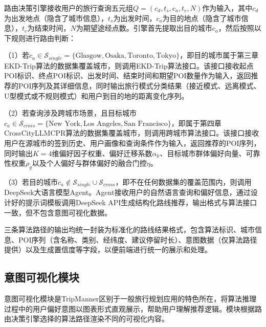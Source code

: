 路由决策引擎接收用户的旅行查询五元组$Q = (c_d, t_s, c_a, t_e, N)$作为输入，其中$c_d$为出发地点（隐含了城市信息），$t_s$为出发时间，$c_a$为目的地点（隐含了城市信息），$t_e$为结束时间，$N$为期望途经点数。引擎首先提取出目的城市$c_a$，然后按照以下规则进行路由判断：

（1）若$c_a \in \mathcal{S}_{single} = \{\text{Glasgow}, \text{Osaka}, \text{Toronto}, \text{Tokyo}\}$，即目的城市属于第三章EKD-Trip算法的数据集覆盖城市，则调用EKD-Trip算法接口。该接口接收起点POI标识、终点POI标识、出发时间、结束时间和期望POI数量作为输入，返回推荐的POI序列及其详细信息，同时输出旅行模式分类结果（接近模式、远离模式、U型模式或不规则模式）和用户到目的地的距离变化序列。

（2）若查询涉及跨城市场景，且目标城市$c_a \in \mathcal{S}_{cross} = \{\text{New York}, \text{Los Angeles}, \text{San Francisco}\}$，即属于第四章CrossCityLLMCPR算法的数据集覆盖城市，则调用跨城市算法接口。该接口接收用户在源城市的签到历史、用户画像和查询条件作为输入，返回推荐的POI序列，同时输出$K=4$维偏好因子权重、偏好迁移系数$\alpha_k$、目标城市群体偏好向量、可靠性权重$\rho_g$以及个人偏好与群体偏好的融合门控$\eta$。

（3）若目的城市$c_a \notin \mathcal{S}_{single} \cup \mathcal{S}_{cross}$，即不在任何数据集的覆盖范围内，则调用DeepSeek大语言模型Agent。Agent接收用户的自然语言查询和偏好信息，通过设计好的提示词模板调用DeepSeek API生成结构化路线推荐，输出格式与算法接口一致，但不包含意图可视化数据。
%

三条算法路径的输出均统一封装为标准化的路线结果格式，包含算法标识、城市信息、POI序列（含名称、类别、经纬度、建议停留时长）、意图数据（仅算法路径提供）以及生成置信度等字段，以便前端进行统一的展示和处理。

\subsection{意图可视化模块}
\label{sec:ch5_intent}

意图可视化模块是TripManner区别于一般旅行规划应用的特色所在，将算法推理过程中的用户偏好意图以图表形式直观展示，帮助用户理解推荐逻辑。模块根据路由决策引擎选择的算法路径渲染不同的可视化内容。

